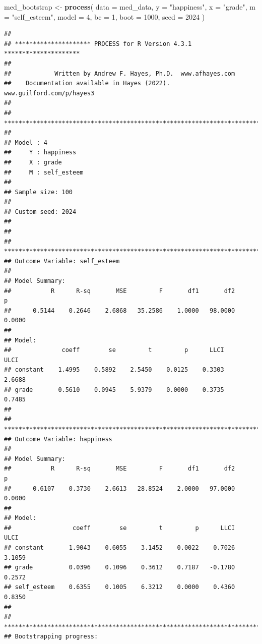 \documentclass[
]{book}
\newenvironment{Shaded}{\begin{snugshade}}{\end{snugshade}}
\newcommand{\AttributeTok}[1]{\textcolor[rgb]{0.13,0.29,0.53}{#1}}
\newcommand{\DecValTok}[1]{\textcolor[rgb]{0.00,0.00,0.81}{#1}}
\newcommand{\FunctionTok}[1]{\textcolor[rgb]{0.13,0.29,0.53}{\textbf{#1}}}
\newcommand{\NormalTok}[1]{#1}
\newcommand{\OtherTok}[1]{\textcolor[rgb]{0.56,0.35,0.01}{#1}}
\newcommand{\StringTok}[1]{\textcolor[rgb]{0.31,0.60,0.02}{#1}}
\begin{document}
\begin{Shaded}
\begin{Highlighting}[]
\NormalTok{med\_bootstrap }\OtherTok{\textless{}{-}} \FunctionTok{process}\NormalTok{(}
  \AttributeTok{data =}\NormalTok{ med\_data,}
  \AttributeTok{y =} \StringTok{"happiness"}\NormalTok{,}
  \AttributeTok{x =} \StringTok{"grade"}\NormalTok{,}
  \AttributeTok{m =} \StringTok{"self\_esteem"}\NormalTok{,}
  \AttributeTok{model =} \DecValTok{4}\NormalTok{,}
  \AttributeTok{bc =} \DecValTok{1}\NormalTok{,}
  \AttributeTok{boot =} \DecValTok{1000}\NormalTok{,}
  \AttributeTok{seed =} \DecValTok{2024}
\NormalTok{)}
\end{Highlighting}
\end{Shaded}

\begin{verbatim}
## 
## ********************* PROCESS for R Version 4.3.1 ********************* 
##  
##            Written by Andrew F. Hayes, Ph.D.  www.afhayes.com              
##    Documentation available in Hayes (2022). www.guilford.com/p/hayes3   
##  
## *********************************************************************** 
##                    
## Model : 4          
##     Y : happiness  
##     X : grade      
##     M : self_esteem
## 
## Sample size: 100
## 
## Custom seed: 2024
## 
## 
## *********************************************************************** 
## Outcome Variable: self_esteem
## 
## Model Summary: 
##           R      R-sq       MSE         F       df1       df2         p
##      0.5144    0.2646    2.6868   35.2586    1.0000   98.0000    0.0000
## 
## Model: 
##              coeff        se         t         p      LLCI      ULCI
## constant    1.4995    0.5892    2.5450    0.0125    0.3303    2.6688
## grade       0.5610    0.0945    5.9379    0.0000    0.3735    0.7485
## 
## *********************************************************************** 
## Outcome Variable: happiness
## 
## Model Summary: 
##           R      R-sq       MSE         F       df1       df2         p
##      0.6107    0.3730    2.6613   28.8524    2.0000   97.0000    0.0000
## 
## Model: 
##                 coeff        se         t         p      LLCI      ULCI
## constant       1.9043    0.6055    3.1452    0.0022    0.7026    3.1059
## grade          0.0396    0.1096    0.3612    0.7187   -0.1780    0.2572
## self_esteem    0.6355    0.1005    6.3212    0.0000    0.4360    0.8350
## 
## *********************************************************************** 
## Bootstrapping progress:

\end{verbatim}
\end{document}
